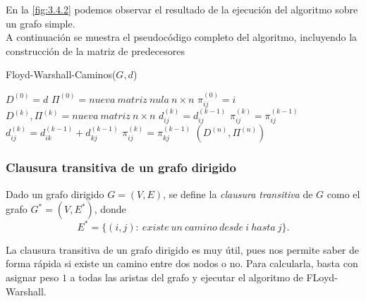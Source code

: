 En la \autoref{fig:3.4.2} podemos observar el resultado de la ejecución del algoritmo sobre un grafo simple. \\

A continuación se muestra el pseudocódigo completo del algoritmo, incluyendo la construcción de la matriz de predecesores

\begin{breakablealgorithm}
	\caption{Floyd-Warshall-Caminos($G,d$)}
	\begin{algorithmic}[1]
		\State $D^{(0)}=d$
		\State $\Pi^{(0)}=nueva\ matriz\ nula\ n\times n$
			\State $\pi_{ij}^{(0)}=i$
		\EndFor
			\State $D^{(k)},\Pi^{(k)}=nueva\ matriz\ n\times n$
						\State $d_{ij}^{(k)}=d_{ij}^{(k-1)}$
						\State $\pi_{ij}^{(k)}=\pi_{ij}^{(k-1)}$
					\Else
						\State $d_{ij}^{(k)}=d_{ik}^{(k-1)}+d_{kj}^{(k-1)}$
						\State $\pi_{ij}^{(k)}=\pi_{kj}^{(k-1)}$
					\EndIf
				\EndFor
			\EndFor
		\EndFor
		\Return $(D^{(n)},\Pi^{(n)})$
	\end{algorithmic}
\end{breakablealgorithm}

\subsubsection{Clausura transitiva de un grafo dirigido}

\begin{definicion}
	Dado un grafo dirigido $G=(V,E)$, se define la \textit{clausura transitiva} de $G$ como el grafo $G^*=(V,E^*)$, donde
	$$E^*=\{(i,j):\ existe\ un\ camino\ desde\ i\ hasta\ j\}.$$
\end{definicion}

La clausura transitiva de un grafo dirigido es muy útil, pues nos permite saber de forma rápida si existe un camino entre dos nodos o no. Para calcularla, basta con asignar peso $1$ a todas las aristas del grafo y ejecutar el algoritmo de FLoyd-Warshall. \\

